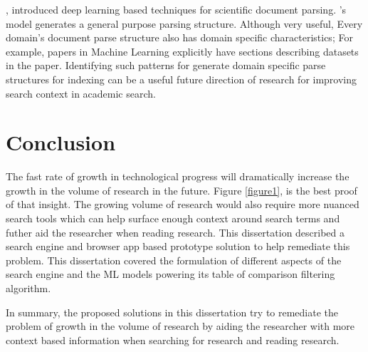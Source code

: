 \cite{kashyap2020sciwing}, introduced deep learning based techniques for scientific document parsing. \cite{kashyap2020sciwing}'s model generates a general purpose parsing structure. Although very useful, Every domain's document parse structure also has domain specific characteristics; For example, papers in Machine Learning explicitly have sections describing datasets in the paper. Identifying such patterns for generate domain specific parse structures for indexing can be a useful future direction of research for improving search context in academic search.  

\section{Conclusion}
The fast rate of growth in technological progress will dramatically increase the growth in the volume of research in the future. Figure \ref{figure1}, is the best proof of that insight. The growing volume of research would also require more nuanced search tools which can help surface enough context around search terms and futher aid the researcher when reading research. This dissertation described a search engine and browser app based prototype solution to help remediate this problem. This dissertation covered the formulation of different aspects of the search engine and the ML models powering its table of comparison filtering algorithm. 

In summary, the proposed solutions in this dissertation try to remediate the problem of growth in the volume of research by aiding the researcher with more context based information when searching for research and reading research.